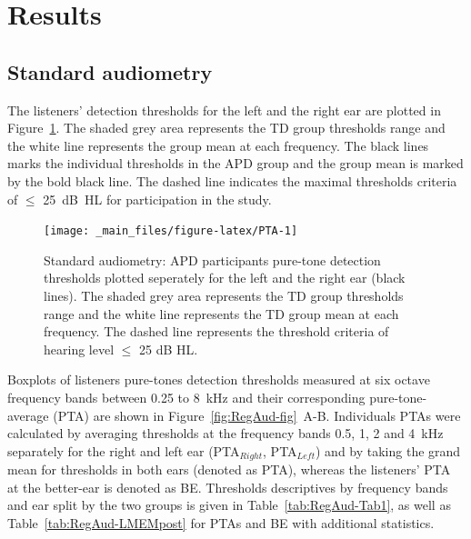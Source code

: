 \documentclass[a4paper, twoside]{templates/ociamthesis}
\begin{document}
\hypertarget{results-3}{%
\section{Results}\label{results-3}}

\hypertarget{standard-audiometry}{%
\subsection{Standard audiometry}\label{standard-audiometry}}

The listeners' detection thresholds for the left and the right ear are plotted in Figure~\ref{fig:PTA}. The shaded grey area represents the TD group thresholds range and the white line represents the group mean at each frequency. The black lines marks the individual thresholds in the APD group and the group mean is marked by the bold black line. The dashed line indicates the maximal thresholds criteria of \(\leq\) 25~dB~HL for participation in the study.\\

\begin{figure}

{\centering \texttt{[image: \_main\_files/figure-latex/PTA-1]} 

}

\caption{Standard audiometry: APD participants pure-tone detection thresholds plotted seperately for the left and the right ear (black lines). The shaded grey area represents the TD group thresholds range and the white line represents the TD group mean at each frequency. The dashed line represents the threshold criteria of hearing level $\leq$ 25 dB HL.}\label{fig:PTA}
\end{figure}

Boxplots of listeners pure-tones detection thresholds measured at six octave frequency bands between 0.25 to 8~kHz and their corresponding pure-tone-average (PTA) are shown in Figure~\ref{fig:RegAud-fig}~A-B. Individuals PTAs were calculated by averaging thresholds at the frequency bands 0.5, 1, 2 and 4~kHz separately for the right and left ear (PTA\(_{Right}\), PTA\(_{Left}\)) and by taking the grand mean for thresholds in both ears (denoted as PTA), whereas the listeners' PTA at the better-ear is denoted as BE. Thresholds descriptives by frequency bands and ear split by the two groups is given in Table~\ref{tab:RegAud-Tab1}, as well as Table~\ref{tab:RegAud-LMEMpost} for PTAs and BE with additional statistics.\\
\end{document}
